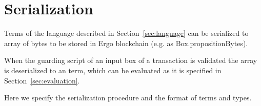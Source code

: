 \section{Serialization}
\label{sec:serialization}

Terms of the language described in Section~\ref{sec:language} can be
serialized to array of bytes to be stored in Ergo blockchain (e.g. as
Box.propositionBytes).

When the guarding script of an input box of a transaction is validated the  array is deserialized to an \langname term, which can be evaluated as it is specified in Section~\ref{sec:evaluation}.

Here we specify the serialization procedure and the format of \langname terms and types.

